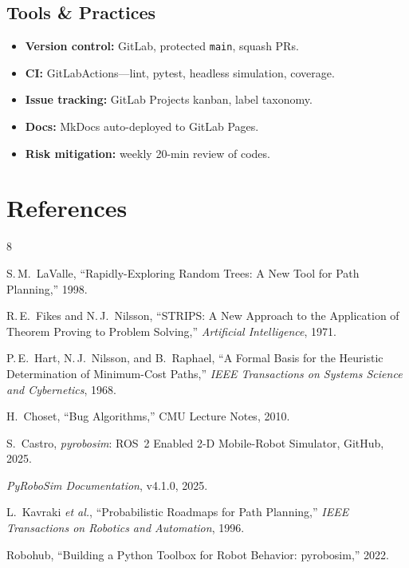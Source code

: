 \documentclass[11pt]{article}
\begin{document}
\subsection{Tools \& Practices}
\begin{itemize}
\item \textbf{Version control:} GitLab, protected \texttt{main}, squash PRs.
\item \textbf{CI:} GitLabActions---lint, pytest, headless simulation, coverage.
\item \textbf{Issue tracking:} GitLab Projects kanban, label taxonomy.
\item \textbf{Docs:} MkDocs auto-deployed to GitLab Pages.
\item \textbf{Risk mitigation:} weekly 20-min review of codes.
\end{itemize}

\section{References}

\begin{thebibliography}{8}

S.\,M.~LaValle, ``Rapidly-Exploring Random Trees: A New Tool for Path Planning,'' 1998.

R.\,E.~Fikes and N.\,J.~Nilsson, ``STRIPS: A New Approach to the Application of Theorem Proving to Problem Solving,'' \emph{Artificial Intelligence}, 1971.

P.\,E.~Hart, N.\,J.~Nilsson, and B.~Raphael, ``A Formal Basis for the Heuristic Determination of Minimum-Cost Paths,'' \emph{IEEE Transactions on Systems Science and Cybernetics}, 1968.

H.~Choset, ``Bug Algorithms,'' CMU Lecture Notes, 2010.

S.~Castro, \emph{pyrobosim}: ROS~2 Enabled 2-D Mobile-Robot Simulator, GitHub, 2025.

\emph{PyRoboSim Documentation}, v4.1.0, 2025.

L.~Kavraki \emph{et al.}, ``Probabilistic Roadmaps for Path Planning,'' \emph{IEEE Transactions on Robotics and Automation}, 1996.

Robohub, ``Building a Python Toolbox for Robot Behavior: pyrobosim,'' 2022.

\end{thebibliography}
\end{document}
